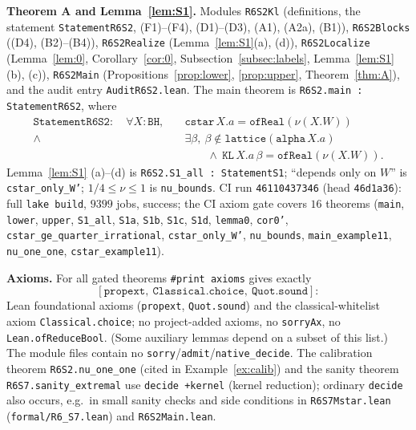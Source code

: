 \documentclass[11pt]{amsart}
\theoremstyle{definition}
\theoremstyle{remark}
\begin{document}
\medskip\noindent\textbf{Theorem A and Lemma~\ref{lem:S1}.} Modules \texttt{R6S2Kl} (definitions, the statement
\texttt{StatementR6S2}, (F1)--(F4), (D1)--(D3), (A1), (A2a), (B1)), \texttt{R6S2Blocks} ((D4), (B2)--(B4)),
\texttt{R6S2Realize} (Lemma~\ref{lem:S1}(a), (d)), \texttt{R6S2Localize} (Lemma~\ref{lem:0}, Corollary~\ref{cor:0},
Subsection~\ref{subsec:labels}, Lemma~\ref{lem:S1}(b), (c)), \texttt{R6S2Main} (Propositions~\ref{prop:lower},
\ref{prop:upper}, Theorem~\ref{thm:A}), and the audit entry \texttt{AuditR6S2.lean}. The main theorem is
\texttt{R6S2.main : StatementR6S2}, where
\begin{align*}
\texttt{StatementR6S2}:\quad\forall X:\texttt{BH},\quad
&\texttt{cstar}\,X.a=\texttt{ofReal}(\nu(X.W))\\
\wedge\ &\exists\beta,\ \beta\notin\texttt{lattice}(\texttt{alpha}\,X.a)\\
&\qquad\wedge\ \texttt{KL}\,X.a\,\beta=\texttt{ofReal}(\nu(X.W)).
\end{align*}
Lemma~\ref{lem:S1} (a)--(d) is \texttt{R6S2.S1\_all : StatementS1}; ``depends only on $W$'' is
\texttt{cstar\_only\_W'}; $1/4\le\nu\le1$ is \texttt{nu\_bounds}. CI run \texttt{46110437346} (head \texttt{46d1a36}):
full \texttt{lake build}, $9399$ jobs, success; the CI axiom gate covers $16$ theorems (\texttt{main}, \texttt{lower},
\texttt{upper}, \texttt{S1\_all}, \texttt{S1a}, \texttt{S1b}, \texttt{S1c}, \texttt{S1d}, \texttt{lemma0}, \texttt{cor0'},
\texttt{cstar\_ge\_quarter\_irrational}, \texttt{cstar\_only\_W'}, \texttt{nu\_bounds}, \texttt{main\_example11},
\texttt{nu\_one\_one}, \texttt{cstar\_example11}).

\medskip\noindent\textbf{Axioms.} For all gated theorems \texttt{\#print axioms} gives exactly
\[
[\texttt{propext},\ \texttt{Classical.choice},\ \texttt{Quot.sound}]:
\]
Lean foundational axioms (\texttt{propext},
\texttt{Quot.sound}) and the classical-whitelist axiom \texttt{Classical.choice}; no project-added axioms, no
\texttt{sorryAx}, no \texttt{Lean.ofReduceBool}. (Some auxiliary lemmas depend on a subset of this list.) The
module files contain no \texttt{sorry}/\texttt{admit}/\texttt{native\_decide}. The calibration theorem
\texttt{R6S2.nu\_one\_one} (cited in Example~\ref{ex:calib}) and the sanity theorem \texttt{R6S7.sanity\_extremal}
use \texttt{decide +kernel} (kernel reduction); ordinary \texttt{decide} also occurs, e.g.\ in small sanity checks
and side conditions in \texttt{R6S7Mstar.lean} (\texttt{formal/R6\_S7.lean}) and \texttt{R6S2Main.lean}.
\end{document}
